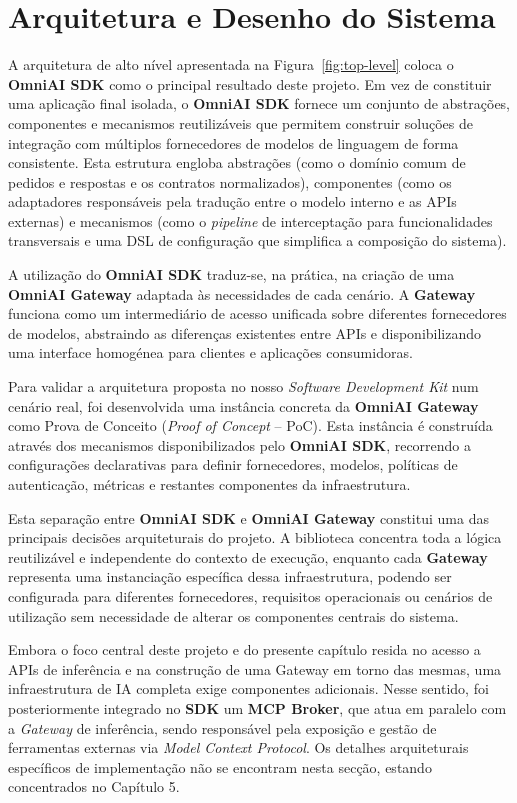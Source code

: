     \chapter{Arquitetura e Desenho do Sistema}

A arquitetura de alto nível apresentada na Figura~\ref{fig:top-level} coloca o \textbf{OmniAI SDK} como o principal resultado deste projeto. Em vez de constituir uma aplicação final isolada, o \textbf{OmniAI SDK} fornece um conjunto de abstrações, componentes e mecanismos reutilizáveis que permitem construir soluções de integração com múltiplos fornecedores de modelos de linguagem de forma consistente. Esta estrutura engloba abstrações (como o domínio comum de pedidos e respostas e os contratos normalizados), componentes (como os adaptadores responsáveis pela tradução entre o modelo interno e as APIs externas) e mecanismos (como o \textit{pipeline} de interceptação para funcionalidades transversais e uma DSL de configuração que simplifica a composição do sistema).

A utilização do \textbf{OmniAI SDK} traduz-se, na prática, na criação de uma \textbf{OmniAI Gateway} adaptada às necessidades de cada cenário. A \textbf{Gateway} funciona como um intermediário de acesso unificada sobre diferentes fornecedores de modelos, abstraindo as diferenças existentes entre APIs e disponibilizando uma interface homogénea para clientes e aplicações consumidoras.

Para validar a arquitetura proposta no nosso \textit{Software Development Kit} num cenário real, foi desenvolvida uma instância concreta da \textbf{OmniAI Gateway} como Prova de Conceito (\textit{Proof of Concept} -- PoC). Esta instância é construída através dos mecanismos disponibilizados pelo \textbf{OmniAI SDK}, recorrendo a configurações declarativas para definir fornecedores, modelos, políticas de autenticação, métricas e restantes componentes da infraestrutura. 

Esta separação entre \textbf{OmniAI SDK} e \textbf{OmniAI Gateway} constitui uma das principais decisões arquiteturais do projeto. A biblioteca concentra toda a lógica reutilizável e independente do contexto de execução, enquanto cada \textbf{Gateway} representa uma instanciação específica dessa infraestrutura, podendo ser configurada para diferentes fornecedores, requisitos operacionais ou cenários de utilização sem necessidade de alterar os componentes centrais do sistema.

Embora o foco central deste projeto e do presente capítulo resida no acesso a APIs de inferência e na construção de uma Gateway em torno das mesmas, uma infraestrutura de IA completa exige componentes adicionais. Nesse sentido, foi posteriormente integrado no \textbf{SDK} um \textbf{MCP Broker}, que atua em paralelo com a \textit{Gateway} de inferência, sendo responsável pela exposição e gestão de ferramentas externas via \textit{Model Context Protocol}. Os detalhes arquiteturais específicos de implementação não se encontram nesta secção, estando concentrados no Capítulo 5.

